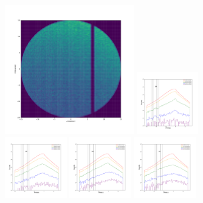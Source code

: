\documentclass[12pt,prd]{article}
\begin{document}
\begin{figure}[h!]
\centering
\includegraphics[width=0.5\textwidth]{../figures/histogram2dgaiascan_l99_0_b50_2_ra224_7_dec60_6_npy.pdf}
\includegraphics[width=0.24\textwidth]{../figures/scanning_plotsgaiascan_l99_0_b50_2_ra224_7_dec60_6_npy_0.pdf}
\includegraphics[width=0.24\textwidth]{../figures/scanning_plotsgaiascan_l99_0_b50_2_ra224_7_dec60_6_npy_1.pdf}
\includegraphics[width=0.24\textwidth]{../figures/scanning_plotsgaiascan_l99_0_b50_2_ra224_7_dec60_6_npy_2.pdf}
\includegraphics[width=0.24\textwidth]{../figures/scanning_plotsgaiascan_l99_0_b50_2_ra224_7_dec60_6_npy_3.pdf}

\end{figure}
\end{document}
